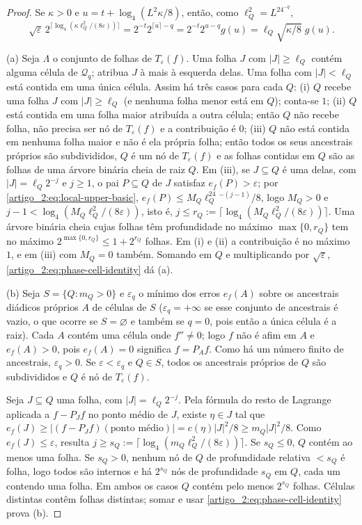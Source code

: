 \begin{proof}
Se $\kappa>0$ e $u=t+\log_4(L^2\kappa/8)$, então, como $\ell_Q^2=L^24^{-q}$,
\begin{equation}
 \sqrt\varepsilon\,2^{\lceil\log_4(\kappa\ell_Q^2/(8\varepsilon))\rceil}
 =2^{-t}2^{\lceil u\rceil-q}=2^{-t}2^{u-q}g(u)=\ell_Q\sqrt{\kappa/8}\;g(u).
 \label{artigo_2:eq:phase-cell-identity}
\end{equation}

(a) Seja $\Lambda$ o conjunto de folhas de $T_\varepsilon(f)$. Uma folha
$J$ com $|J|\ge\ell_Q$ contém alguma célula de $\mathcal Q_q$; atribua $J$
à mais à esquerda delas. Uma folha com $|J|<\ell_Q$ está contida em uma única
célula. Assim há três casos para cada $Q$: (i) $Q$ recebe uma folha $J$ com
$|J|\ge\ell_Q$ (e nenhuma folha menor está em $Q$); conta-se $1$; (ii) $Q$ está
contida em uma folha maior atribuída a outra célula; então $Q$ não recebe folha,
não precisa ser nó de $T_\varepsilon(f)$ e a contribuição é $0$; (iii) $Q$ não
está contida em nenhuma folha maior e não é ela própria folha; então
todos os seus ancestrais próprios são subdivididos, $Q$ é um nó de
$T_\varepsilon(f)$ e as folhas contidas em $Q$ são as folhas
de uma árvore binária cheia de raiz $Q$. Em (iii), se $J\subseteq Q$ é uma delas, com
$|J|=\ell_Q2^{-j}$ e $j\ge1$, o pai $P\subseteq Q$ de $J$ satisfaz
$e_f(P)>\varepsilon$; por \eqref{artigo_2:eq:local-upper-basic},
$e_f(P)\le M_Q\ell_Q^24^{-(j-1)}/8$, logo $M_Q>0$ e
$j-1<\log_4(M_Q\ell_Q^2/(8\varepsilon))$, isto é,
$j\le r_Q:=\lceil\log_4(M_Q\ell_Q^2/(8\varepsilon))\rceil$. Uma árvore binária cheia
cujas folhas têm profundidade no máximo $\max\{0,r_Q\}$ tem no máximo
$2^{\max\{0,r_Q\}}\le1+2^{r_Q}$ folhas. Em (i) e (ii) a contribuição é no máximo
$1$, e em (iii) com $M_Q=0$ também. Somando em $Q$
e multiplicando por $\sqrt\varepsilon$,
\eqref{artigo_2:eq:phase-cell-identity} dá (a).

(b) Seja $S=\{Q:m_Q>0\}$ e $\varepsilon_q$ o mínimo dos erros $e_f(A)$ sobre
os ancestrais diádicos próprios $A$ de células de $S$ ($\varepsilon_q=+\infty$ se
esse conjunto de ancestrais é vazio, o que ocorre se $S=\varnothing$ e também se
$q=0$, pois então a única célula é a raiz). Cada $A$ contém uma célula onde $f''\ne0$; logo $f$ não é afim em $A$
e $e_f(A)>0$, pois $e_f(A)=0$ significa $f=P_Af$. Como há um número finito de
ancestrais, $\varepsilon_q>0$. Se $\varepsilon<\varepsilon_q$ e $Q\in S$, todos os
ancestrais próprios de $Q$ são subdivididos e $Q$ é nó de $T_\varepsilon(f)$.

Seja $J\subseteq Q$ uma folha, com $|J|=\ell_Q2^{-j}$. Pela fórmula do resto
de Lagrange aplicada a $f-P_Jf$ no ponto médio de $J$, existe $\eta\in J$
tal que
$e_f(J)\ge|(f-P_Jf)(\text{ponto médio})|=c(\eta)|J|^2/8\ge m_Q|J|^2/8$.
Como $e_f(J)\le\varepsilon$, resulta $j\ge s_Q:=\lceil\log_4(m_Q\ell_Q^2/(8\varepsilon))\rceil$.
Se $s_Q\le0$, $Q$ contém ao menos uma folha. Se $s_Q>0$, nenhum nó de $Q$ de
profundidade relativa $<s_Q$ é folha, logo todos são internos e há $2^{s_Q}$
nós de profundidade $s_Q$ em $Q$, cada um contendo uma folha. Em ambos os casos
$Q$ contém pelo menos $2^{s_Q}$ folhas. Células distintas contêm folhas
distintas; somar e usar \eqref{artigo_2:eq:phase-cell-identity} prova (b).
\end{proof}

